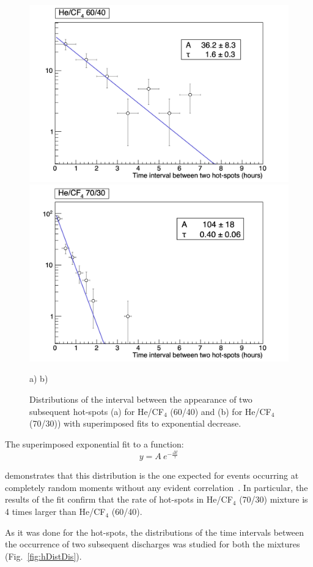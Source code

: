 \documentclass[a4paper,11pt]{article}
\begin{document}
\begin{figure}[ht]
\begin{center}
    
	\includegraphics[width=0.45\linewidth]{Figures/hDistHot_6040.png}
	\includegraphics[width=0.45\linewidth]{Figures/hDistHot_7030.png}\\

\end{center}	
\vspace{-0.6cm}
\hspace{4cm}\mbox{a)} \hspace{6.5cm} \mbox{b)}
\vspace{-0.3cm}

  	\caption{Distributions of the interval between the appearance of two subsequent hot-spots (a) for He/CF$_4$ (60/40) and (b) for He/CF$_4$ (70/30)) with superimposed fits to exponential decrease.}
  	\label{fig:hDist}
\end{figure}

The superimposed exponential fit to a function:
\begin{equation}
\label{eq:exp}
y = A~e^{-\frac{\Delta t}{\tau}}
\end{equation}

demonstrates that this distribution is the one expected for events occurring at completely random moments without any evident correlation~\cite{bib:knoll}.
In particular, the results of the fit confirm that the rate of hot-spots in He/CF$_4$ (70/30) mixture is 4 times larger than He/CF$_4$ (60/40).

As it was done for the hot-spots, the distributions of the time intervals between the occurrence of two subsequent discharges was studied for both the mixtures (Fig.~\ref{fig:hDistDis}).
\end{document}
